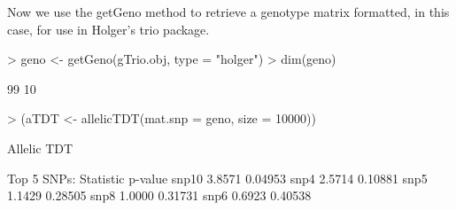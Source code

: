 \documentclass[10pt]{article}
\begin{document}
Now we use the getGeno method to retrieve a genotype matrix formatted, in this case, for use in Holger's trio package.
\begin{Schunk}
\begin{Sinput}
> geno <- getGeno(gTrio.obj, type = "holger")
> dim(geno)
\end{Sinput}
\begin{Soutput}
[1] 99 10
\end{Soutput}
\begin{Sinput}
> (aTDT <- allelicTDT(mat.snp = geno, size = 10000))
\end{Sinput}
\begin{Soutput}
      Allelic TDT

Top 5 SNPs:
      Statistic p-value
snp10    3.8571 0.04953
snp4     2.5714 0.10881
snp5     1.1429 0.28505
snp8     1.0000 0.31731
snp6     0.6923 0.40538
\end{Soutput}
\end{Schunk}
\end{document}
